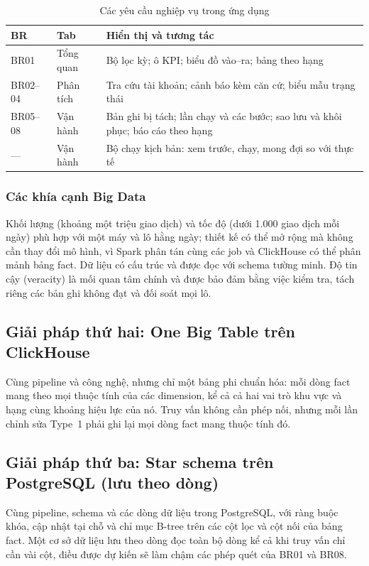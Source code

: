 \documentclass[peerreview]{IEEEtran}
\begin{document}
\begin{table}[!t]
\centering
\caption{Các yêu cầu nghiệp vụ trong ứng dụng}
\label{tab:appmap}
\footnotesize
\setlength{\tabcolsep}{4pt}
\begin{tabular}{l L{1.6cm} L{5.0cm}}
\toprule
\textbf{BR} & \textbf{Tab} & \textbf{Hiển thị và tương tác} \\
\midrule
BR01 & Tổng quan & Bộ lọc kỳ; ô KPI; biểu đồ vào--ra; bảng theo hạng \\
BR02--04 & Phân tích & Tra cứu tài khoản; cảnh báo kèm căn cứ; biểu mẫu trạng thái \\
BR05--08 & Vận hành & Bản ghi bị tách; lần chạy và các bước; sao lưu và khôi phục; báo cáo theo hạng \\
--- & Vận hành & Bộ chạy kịch bản: xem trước, chạy, mong đợi so với thực tế \\
\bottomrule
\end{tabular}
\end{table}

\subsubsection{Các khía cạnh Big Data}
Khối lượng (khoảng một triệu giao dịch) và tốc độ (dưới 1.000 giao dịch mỗi ngày) phù hợp
với một máy và lô hằng ngày; thiết kế có thể mở rộng mà không cần thay đổi mô hình, vì Spark
phân tán cùng các job và ClickHouse có thể phân mảnh bảng fact. Dữ liệu có cấu trúc và được
đọc với schema tường minh. Độ tin cậy (veracity) là mối quan tâm chính và được bảo đảm bằng
việc kiểm tra, tách riêng các bản ghi không đạt và đối soát mọi lô.

\subsection{Giải pháp thứ hai: One Big Table trên ClickHouse}
\label{sec:sol-obt}
Cùng pipeline và công nghệ, nhưng chỉ một bảng phi chuẩn hóa: mỗi dòng fact mang theo mọi
thuộc tính của các dimension, kể cả cả hai vai trò khu vực và hạng cùng khoảng hiệu lực của
nó. Truy vấn không cần phép nối, nhưng mỗi lần chỉnh sửa Type~1 phải ghi lại mọi dòng fact
mang thuộc tính đó.

\subsection{Giải pháp thứ ba: Star schema trên PostgreSQL (lưu theo dòng)}
\label{sec:sol-postgres}
Cùng pipeline, schema và các dòng dữ liệu trong PostgreSQL, với ràng buộc khóa, cập nhật tại
chỗ và chỉ mục B-tree trên các cột lọc và cột nối của bảng fact. Một cơ sở dữ liệu lưu theo
dòng đọc toàn bộ dòng kể cả khi truy vấn chỉ cần vài cột, điều được dự kiến sẽ làm chậm các
phép quét của BR01 và BR08.
\end{document}
